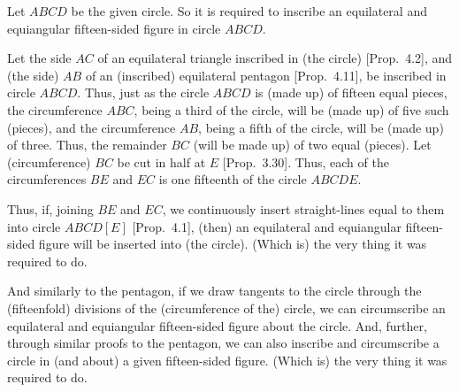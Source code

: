 \begin{Parallel}{}{}
{Let $ABCD$ be the given circle. So it is required to inscribe an equilateral
and equiangular fifteen-sided figure in circle $ABCD$.

Let the side $AC$ of an equilateral triangle inscribed in (the circle) [Prop.~4.2],
and (the side) $AB$ of an (inscribed) equilateral pentagon [Prop.~4.11],
 be inscribed in circle $ABCD$.
 Thus,   just as the circle $ABCD$ is (made up) of fifteen equal pieces, the
 circumference $ABC$, being a third of the circle, will be (made up) of five
 such (pieces), and the
 circumference $AB$, being a fifth of the circle, will be (made up) of  three.
 Thus, the remainder $BC$ (will be made up) of two equal (pieces).
 Let (circumference) $BC$ be cut in half at $E$ [Prop.~3.30].
 Thus, each of the circumferences $BE$ and $EC$ is one fifteenth of the circle
 $ABCDE$.
 
 Thus, if, joining $BE$ and $EC$, we continuously insert straight-lines
 equal to them into circle $ABCD[E]$ [Prop.~4.1],
 (then) an equilateral and equiangular fifteen-sided figure will be
 inserted into (the circle). (Which is) the very thing it was required to do.
 
 And similarly to the pentagon, if we draw  tangents to the circle through
the (fifteenfold) divisions of the (circumference of the) circle, we can
circumscribe an equilateral and equiangular fifteen-sided figure about
the circle. 
 And, further, through similar proofs to the  pentagon,
 we can also inscribe and circumscribe  a circle in (and about)  a given fifteen-sided 
  figure. (Which is) the very thing it was required to do.}
\end{Parallel}
